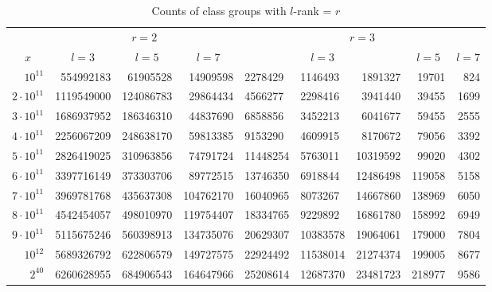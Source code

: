 \documentclass{mcom-l}
\theoremstyle{definition}
\begin{document}
\begin{table}[htb]
\centering
\caption{Counts of class groups with $l$-rank = $r$}
\label{tab:CL_plr}
\begin{tabular}{| r || r | r | r || H H r | r | r |}
\hline
 & 
 & 
 \\

 & 
 &
 &
 &
 &
 & 
 \\
\hline
\hline
$10^{11}$	& 554992183	& 61905528	& 14909598	& 2278429	& 1146493	& 1891327	& 19701	& 824\\
\hline
$2\cdot 10^{11}$	& 1119549000	& 124086783	& 29864434	& 4566277	& 2298416	& 3941440	& 39455	& 1699\\
\hline
$3\cdot 10^{11}$	& 1686937952	& 186346310	& 44837690	& 6858856	& 3452213	& 6041677	& 59455	& 2555\\
\hline
$4\cdot 10^{11}$	& 2256067209	& 248638170	& 59813385	& 9153290	& 4609915	& 8170672	& 79056	& 3392\\
\hline
$5\cdot 10^{11}$	& 2826419025	& 310963856	& 74791724	& 11448254	& 5763011	& 10319592	& 99020	& 4302\\
\hline
$6\cdot 10^{11}$	& 3397716149	& 373303706	& 89772515	& 13746350	& 6918844	& 12486498	& 119058	& 5158\\
\hline
$7\cdot 10^{11}$	& 3969781768	& 435637308	& 104762170	& 16040965	& 8073267	& 14667860	& 138969	& 6050\\
\hline
$8\cdot 10^{11}$	& 4542454057	& 498010970	& 119754407	& 18334765	& 9229892	& 16861780	& 158992	& 6949\\
\hline
$9\cdot 10^{11}$	& 5115675246	& 560398913	& 134735076	& 20629307	& 10383578	& 19064061	& 179000	& 7804\\
\hline
$10^{12}$	& 5689326792	& 622806579	& 149727575	& 22924492	& 11538014	& 21274374	& 199005	& 8677\\
\hline
$2^{40}$	& 6260628955	& 684906543	& 164647966	& 25208614	& 12687370	& 23481723	& 218977	& 9586\\
\hline
\end{tabular}
\end{table}
\end{document}
